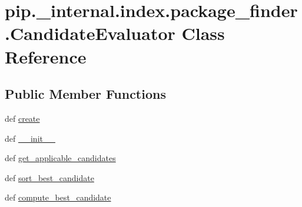 \hypertarget{classpip_1_1__internal_1_1index_1_1package__finder_1_1CandidateEvaluator}{}\section{pip.\+\_\+internal.\+index.\+package\+\_\+finder.\+Candidate\+Evaluator Class Reference}
\label{classpip_1_1__internal_1_1index_1_1package__finder_1_1CandidateEvaluator}
\subsection*{Public Member Functions}
\begin{DoxyCompactItemize}
\item 
def \hyperlink{classpip_1_1__internal_1_1index_1_1package__finder_1_1CandidateEvaluator_ad36edebf2b1e39c05ac409433d8a50bd}{create}
\item 
def \hyperlink{classpip_1_1__internal_1_1index_1_1package__finder_1_1CandidateEvaluator_a6905f284955447041c2d96c2e0e10518}{\+\_\+\+\_\+init\+\_\+\+\_\+}
\item 
def \hyperlink{classpip_1_1__internal_1_1index_1_1package__finder_1_1CandidateEvaluator_a409d697a6b4090ce938165e5bfd8eb18}{get\+\_\+applicable\+\_\+candidates}
\item 
def \hyperlink{classpip_1_1__internal_1_1index_1_1package__finder_1_1CandidateEvaluator_a34817c5199ed7fbd26fac0904c9f2549}{sort\+\_\+best\+\_\+candidate}
\item 
def \hyperlink{classpip_1_1__internal_1_1index_1_1package__finder_1_1CandidateEvaluator_af2e787788dd9e56e7ea02431ea0c454c}{compute\+\_\+best\+\_\+candidate}
\end{DoxyCompactItemize}
